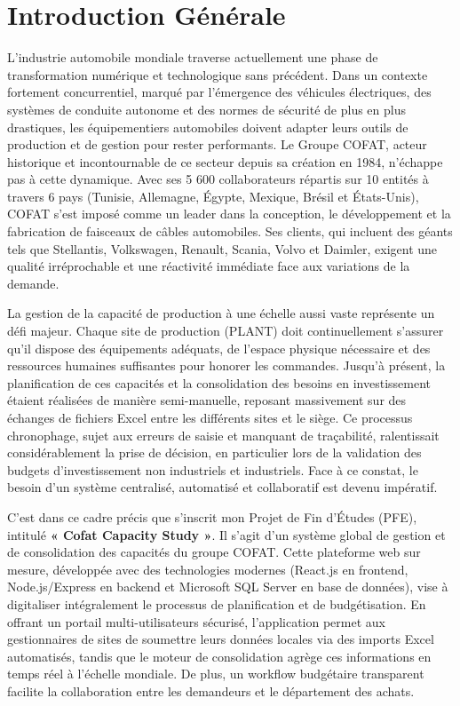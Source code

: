 \chapter*{Introduction Générale}

L'industrie automobile mondiale traverse actuellement une phase de transformation numérique et technologique sans précédent. Dans un contexte fortement concurrentiel, marqué par l'émergence des véhicules électriques, des systèmes de conduite autonome et des normes de sécurité de plus en plus drastiques, les équipementiers automobiles doivent adapter leurs outils de production et de gestion pour rester performants. Le Groupe COFAT, acteur historique et incontournable de ce secteur depuis sa création en 1984, n'échappe pas à cette dynamique. Avec ses 5 600 collaborateurs répartis sur 10 entités à travers 6 pays (Tunisie, Allemagne, Égypte, Mexique, Brésil et États-Unis), COFAT s'est imposé comme un leader dans la conception, le développement et la fabrication de faisceaux de câbles automobiles. Ses clients, qui incluent des géants tels que Stellantis, Volkswagen, Renault, Scania, Volvo et Daimler, exigent une qualité irréprochable et une réactivité immédiate face aux variations de la demande.

La gestion de la capacité de production à une échelle aussi vaste représente un défi majeur. Chaque site de production (PLANT) doit continuellement s'assurer qu'il dispose des équipements adéquats, de l'espace physique nécessaire et des ressources humaines suffisantes pour honorer les commandes. Jusqu'à présent, la planification de ces capacités et la consolidation des besoins en investissement étaient réalisées de manière semi-manuelle, reposant massivement sur des échanges de fichiers Excel entre les différents sites et le siège. Ce processus chronophage, sujet aux erreurs de saisie et manquant de traçabilité, ralentissait considérablement la prise de décision, en particulier lors de la validation des budgets d'investissement non industriels et industriels. Face à ce constat, le besoin d'un système centralisé, automatisé et collaboratif est devenu impératif. 

C'est dans ce cadre précis que s'inscrit mon Projet de Fin d'Études (PFE), intitulé \textbf{« Cofat Capacity Study »}. Il s'agit d'un système global de gestion et de consolidation des capacités du groupe COFAT. Cette plateforme web sur mesure, développée avec des technologies modernes (React.js en frontend, Node.js/Express en backend et Microsoft SQL Server en base de données), vise à digitaliser intégralement le processus de planification et de budgétisation. En offrant un portail multi-utilisateurs sécurisé, l'application permet aux gestionnaires de sites de soumettre leurs données locales via des imports Excel automatisés, tandis que le moteur de consolidation agrège ces informations en temps réel à l'échelle mondiale. De plus, un workflow budgétaire transparent facilite la collaboration entre les demandeurs et le département des achats.

